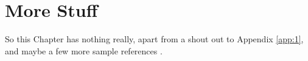 

\chapter{More Stuff} 
\label{chap:2}


So this Chapter has nothing really, apart from a shout out to Appendix \ref{app:1}, and maybe a few more sample references \citep{harper_2006, seaquist_taylor_1990}.
